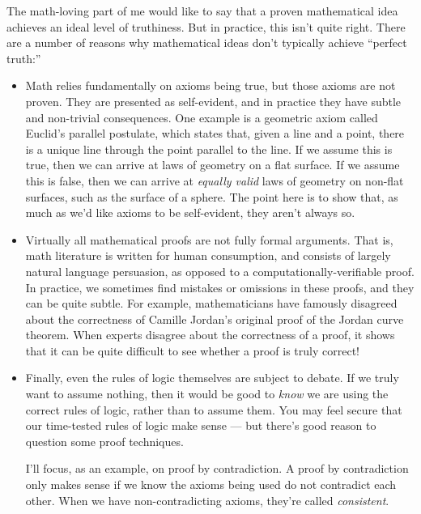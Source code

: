 \documentclass[11pt, oneside]{article}   	%
\begin{document}
The math-loving part of me would like to say that a proven mathematical idea
achieves an ideal level of truthiness. But in practice, this isn't quite
right. There are a number of reasons why mathematical ideas don't typically
achieve ``perfect truth:''
\begin{itemize}
    \item Math relies fundamentally on axioms being true, but those axioms are
        not proven. They are presented as self-evident, and in practice they
        have subtle and non-trivial consequences.
        One example is a geometric axiom called Euclid's parallel postulate,
        which states that, given a line and a point, there is a unique line
        through the point parallel to the line. If we assume this is true, then
        we can arrive at laws of geometry on a flat surface. If we assume this
        is false, then we can arrive at {\em equally valid} laws of geometry on
        non-flat surfaces, such as the surface of a sphere. The point here is to
        show that, as much as we'd like axioms to be self-evident, they aren't
        always so.
    \item Virtually all mathematical proofs are not fully formal
        arguments. That is, math literature is written for human consumption,
        and consists of largely natural language persuasion, as opposed to a
        computationally-verifiable proof. In practice, we sometimes find
        mistakes or omissions in these proofs, and they can be quite subtle. For
        example, mathematicians have famously disagreed about the correctness of
        Camille Jordan's original proof of the Jordan curve theorem.
        When experts disagree about the correctness of a proof, it shows that it
        can be quite difficult to see whether a proof is truly correct!
    \item Finally, even the rules of logic themselves are subject to debate. If
        we truly want to assume nothing, then it would be good to {\em know} we
        are using the correct rules of logic, rather than to assume them.
        You may feel secure that our time-tested rules of logic make sense ---
        but there's good reason to question some proof techniques.

        I'll focus, as an example, on proof by contradiction.
        A proof by contradiction
        only makes sense if we know the axioms being used do not contradict each
        other. When we have non-contradicting axioms, they're called {\em
        consistent}.


\end{itemize}
\end{document}
